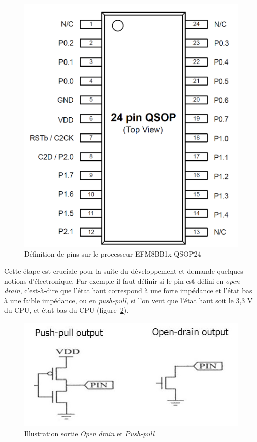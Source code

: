 \documentclass[a4paper, 11pt]{report}
\begin{document}
\begin{figure}[!h]
\begin{center}
\includegraphics[scale=0.4]{figures/screenshots/pins_definition_EFM8BB.png}
\end{center}
\caption{Définition de pins sur le processeur EFM8BB1x-QSOP24\cite{EFM8BB1_datasheet}}
\label{fig:pins_definition}
\end{figure}

Cette étape est cruciale pour la suite du développement et demande quelques notions d’électronique. Par exemple il faut définir si le pin est défini en \emph{open drain}, c’est-à-dire que l’état haut correspond à une forte impédance et l’état bas à une faible impédance, ou en \emph{push-pull}, si l’on veut que l’état haut soit le 3,3 V du CPU, et état bas du CPU (figure~\ref{fig:opendrain_pushpull}). 

\begin{figure}[!h]
\begin{center}
\includegraphics[scale=0.55]{figures/screenshots/opendrain_pushpull.png}
\end{center}
\caption{Illustration sortie \emph{Open drain} et \emph{Push-pull}} 
\label{fig:opendrain_pushpull}
\end{figure}
\end{document}
